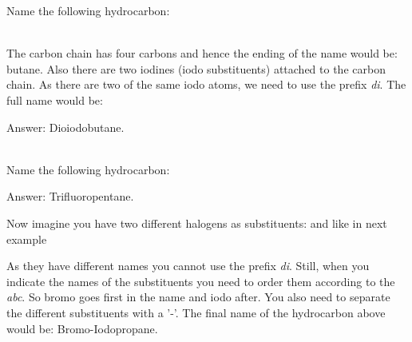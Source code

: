 \documentclass[main.tex]{subfiles}
\newcommand{\mytriangleright}[1]{\tikz{\filldraw[draw=#1,fill=#1] (0,0) --(0em,0.6em) -- (0.4em,0.3em);}}
\begin{document}
\begin{description}
\begin{example} %
Name the following hydrocarbon:
\begin{center} \end{center}
\\
The carbon chain has four carbons and hence the ending of the name would be: butane. Also there are two iodines (iodo substituents) attached to the carbon chain. As there are two of the same iodo atoms, we need to use the prefix \emph{di}. The full name would be: 
\begin{flushright} \mytriangleright{dgreen}\small Answer: Dioiodobutane. \end{flushright}
\faDiamond\ \\
Name the following hydrocarbon:
\begin{center} \end{center}
\begin{flushright} \mytriangleright{dgreen}\small Answer: Trifluoropentane. \end{flushright}

\end{example}%



\item[\docfilehook{  Alkanes with different substituents}{Alkanes with different substituents}] 
Now imagine you have two different halogens as substituents:  and  like in next example

\begin{center} \end{center}
As they have different names you cannot use the prefix \emph{di}. Still, when you indicate the names of the substituents you need to order them according to the \emph{abc}. So bromo goes first in the name and iodo after. You also need to separate the different substituents with a '-'. The final name of the hydrocarbon above would be: Bromo-Iodopropane.




\end{description}
\end{document}
